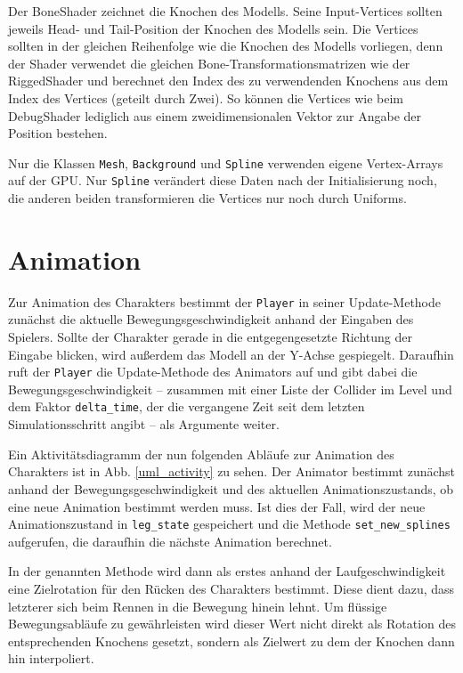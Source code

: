 Der BoneShader zeichnet die Knochen des Modells. Seine Input-Vertices sollten jeweils Head- und Tail-Position der Knochen des Modells sein. Die Vertices sollten in der gleichen Reihenfolge wie die Knochen des Modells vorliegen, denn der Shader verwendet die gleichen Bone-Transformationsmatrizen wie der RiggedShader und berechnet den Index des zu verwendenden Knochens aus dem Index des Vertices (geteilt durch Zwei). So können die Vertices wie beim DebugShader lediglich aus einem zweidimensionalen Vektor zur Angabe der Position bestehen.

Nur die Klassen \lstinline{Mesh}, \lstinline{Background} und \lstinline{Spline} verwenden eigene Vertex-Arrays auf der GPU. Nur \lstinline{Spline} verändert diese Daten nach der Initialisierung noch, die anderen beiden transformieren die Vertices nur noch durch Uniforms.

\section{Animation} \label{animator_section}
Zur Animation des Charakters bestimmt der \lstinline{Player} in seiner Update-Methode zunächst die aktuelle Bewegungsgeschwindigkeit anhand der Eingaben des Spielers. Sollte der Charakter gerade in die entgegengesetzte Richtung der Eingabe blicken, wird außerdem das Modell an der Y-Achse gespiegelt. Daraufhin ruft der \lstinline{Player} die Update-Methode des Animators auf und gibt dabei die Bewegungsgeschwindigkeit -- zusammen mit einer Liste der Collider im Level und dem Faktor \lstinline{delta_time}, der die vergangene Zeit seit dem letzten Simulationsschritt angibt -- als Argumente weiter.

Ein Aktivitätsdiagramm der nun folgenden Abläufe zur Animation des Charakters ist in Abb. \ref{uml_activity} zu sehen. Der Animator bestimmt zunächst anhand der Bewegungsgeschwindigkeit und des aktuellen Animationszustands, ob eine neue Animation bestimmt werden muss. Ist dies der Fall, wird der neue Animationszustand in \lstinline{leg_state} gespeichert und die Methode \lstinline{set_new_splines} aufgerufen, die daraufhin die nächste Animation berechnet.

In der genannten Methode wird dann als erstes anhand der Laufgeschwindigkeit eine Zielrotation für den Rücken des Charakters bestimmt. Diese dient dazu, dass letzterer sich beim Rennen in die Bewegung hinein lehnt. Um flüssige Bewegungsabläufe zu gewährleisten wird dieser Wert nicht direkt als Rotation des entsprechenden Knochens gesetzt, sondern als Zielwert zu dem der Knochen dann hin interpoliert.

